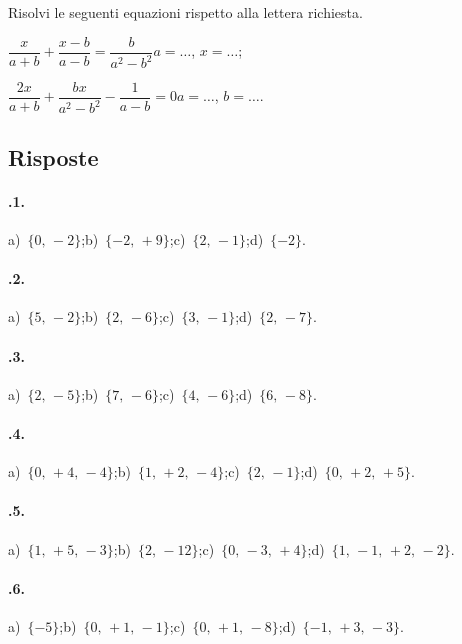 \begin{esercizio}[\Ast]
\label{ese:20.70}
Risolvi le seguenti equazioni rispetto alla lettera richiesta.
\TabPositions{5cm}
\begin{enumeratea}
 \item $\dfrac{x}{a+b}+\dfrac{x-b}{a-b}=\dfrac{b}{a^{2}-b^{2}}$\tab$a=\ldots$, $x=\ldots$;
 \item $\dfrac{2x}{a+b}+\dfrac{bx}{a^{2}-b^{2}}-\dfrac{1}{a-b}=0$\tab$a=\ldots$, $b=\ldots$.
\end{enumeratea}
\end{esercizio}

\subsection{Risposte}
\begin{multicols}{2}
 \paragraph{\thechapter.1.}
a)~$\{0\text{,~}-2\}$;\quad b)~$\{-2\text{,~}+9\}$;\quad c)~$\{2\text{,~}-1\}$;\quad d)~$\{-2\}$.
\paragraph{\thechapter.2.}
a)~$\{5\text{,~}-2\}$;\quad b)~$\{2\text{,~}-6\}$;\quad c)~$\{3\text{,~}-1\}$;\quad d)~$\{2\text{,~}-7\}$.
\paragraph{\thechapter.3.}
a)~$\{2\text{,~}-5\}$;\quad b)~$\{7\text{,~}-6\}$;\quad c)~$\{4\text{,~}-6\}$;\quad d)~$\{6\text{,~}-8\}$.
\paragraph{\thechapter.4.}
a)~$\{0\text{,~}+4\text{,~}-4\}$;\quad b)~$\{1\text{,~}+2\text{,~}-4\}$;\quad c)~$\{2\text{,~}-1\}$;\quad d)~$\{0\text{,~}+2\text{,~}+5\}$.
\paragraph{\thechapter.5.}
a)~$\{1\text{,~}+5\text{,~}-3\}$;\quad b)~$\{2\text{,~}-12\}$;\quad c)~$\{0\text{,~}-3\text{,~}+4\}$;\quad d)~$\{1\text{,~}-1\text{,~}+2\text{,~}-2\}$.
\paragraph{\thechapter.6.}
a)~$\{-5\}$;\quad b)~$\{0\text{,~}+1\text{,~}-1\}$;\quad c)~$\{0\text{,~}+1\text{,~}-8\}$;\quad d)~$\{-1\text{,~}+3\text{,~}-3\}$.

\end{multicols}
